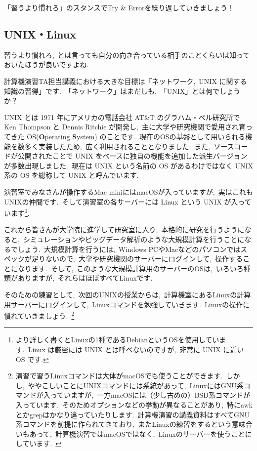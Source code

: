 \documentclass{jarticle}
\begin{document}
「習うより慣れろ」のスタンスでTry \& Errorを繰り返していきましょう！

\subsection{UNIX・Linux}
習うより慣れろ,\ とは言っても自分の向き合っている相手のことくらいは知っておいたほうが良いですよね.\ 

計算機演習TA担当講義における大きな目標は「ネットワーク,\ UNIX に関する知識の習得」です.\ 「ネットワーク」はまだしも,\ 「UNIX」とは何でしょうか？

\vspace{1em}

UNIX とは 1971 年にアメリカの電話会社 AT\&T のグラハム・ベル研究所で Ken Thompson と Dennis Ritchie が開発し,\ 主に大学や研究機関で愛用され育ってきた OS(\textbf{O}perating \textbf{S}ystem) のことです.\ 現在のOSの基盤として用いられる機能を数多く実装したため,\ 広く利用されることとなりました.\ また,\ ソースコードが公開されたことで UNIX をベースに独自の機能を追加した派生バージョンが多数出現しました.\ 現在は UNIX という名前の OS があるわけではなく UNIX 系の OS を総称して UNIX と呼んでいます.\ 


演習室でみなさんが操作するMac miniにはmacOSが入っていますが,\ 実はこれもUNIXの仲間です.\ 
そして演習室の各サーバーには Linux という UNIX が入っています\footnote{より詳しく書くとLinuxの1種であるDebianというOSを使用しています.\ Linux は厳密には UNIX とは呼べないのですが,\ 非常に UNIX に近い OS です.}.

\vspace{1em}

これから皆さんが大学院に進学して研究室に入り,\ 本格的に研究を行うようになると,\ 
シミュレーションやビッグデータ解析のような大規模計算を行うことになるでしょう.\ 
大規模計算を行うには,\ Windows PCやMacなどのパソコンではスペックが足りないので,\ 
大学や研究機関のサーバーにログインして,\ 操作することになります.\ 
そして,\ このような大規模計算用のサーバーのOSは,\ いろいろ種類がありますが,\ 
それらはほぼすべてLinuxです.\ 

そのための練習として,\ 次回のUNIXの授業からは,\ 計算機室にあるLinuxの計算用サーバーにログインして,\ 
Linuxコマンドを勉強していきます.\ Linuxの操作に慣れていきましょう.\ \footnote{演習で習うLinuxコマンドは大体がmacOSでも使うことができます.\ しかし,\ ややこしいことにUNIXコマンドには系統があって,\ LinuxにはGNU系コマンドが入っていますが,\ 一方macOSには（少し古めの）BSD系コマンドが入っています.\ そのためオプションなどの挙動が異なることがあり,\ 特にawkとかgrepはかなり違っていたりします.\ 計算機演習の講義資料はすべてGNU系コマンドを前提に作られてきており,\ またLinuxの練習をするという意味合いもあって,\ 計算機演習ではmacOSではなく,\ Linuxのサーバーを使うことにしています.\ }
\end{document}
